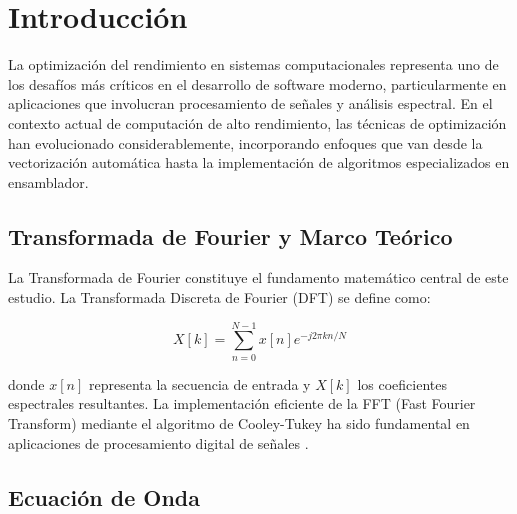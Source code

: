 \documentclass[a4paper]{article}
\begin{document}


\maketitle

\tableofcontents
\newpage

\section{Introducción}

La optimización del rendimiento en sistemas computacionales representa uno de los desafíos más críticos en el desarrollo de software moderno, particularmente en aplicaciones que involucran procesamiento de señales y análisis espectral. En el contexto actual de computación de alto rendimiento, las técnicas de optimización han evolucionado considerablemente, incorporando enfoques que van desde la vectorización automática hasta la implementación de algoritmos especializados en ensamblador.

\subsection{Transformada de Fourier y Marco Teórico}

La Transformada de Fourier constituye el fundamento matemático central de este estudio. La Transformada Discreta de Fourier (DFT) se define como:

\begin{equation}
X[k] = \sum_{n=0}^{N-1} x[n] e^{-j2\pi kn/N}
\end{equation}

donde $x[n]$ representa la secuencia de entrada y $X[k]$ los coeficientes espectrales resultantes. La implementación eficiente de la FFT (Fast Fourier Transform) mediante el algoritmo de Cooley-Tukey ha sido fundamental en aplicaciones de procesamiento digital de señales \cite{cooley1965algorithm}.

\subsection{Ecuación de Onda}
\end{document}
